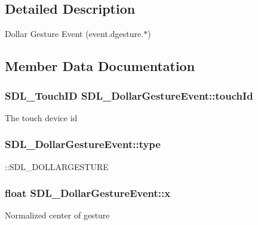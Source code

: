 \subsection{Detailed Description}
Dollar Gesture Event (event.\+dgesture.$\ast$) 

\subsection{Member Data Documentation}
\hypertarget{struct_s_d_l___dollar_gesture_event_a40402f6911ed0dba48e6b23aa02bd83d}{}
\subsubsection[{touch\+Id}]{\setlength{\rightskip}{0pt plus 5cm}S\+D\+L\+\_\+\+Touch\+I\+D S\+D\+L\+\_\+\+Dollar\+Gesture\+Event\+::touch\+Id}\label{struct_s_d_l___dollar_gesture_event_a40402f6911ed0dba48e6b23aa02bd83d}
The touch device id \hypertarget{struct_s_d_l___dollar_gesture_event_ac7f6948754a1b2eb36edde043bf75ce9}{}
\subsubsection[{type}]{ S\+D\+L\+\_\+\+Dollar\+Gesture\+Event\+::type}\label{struct_s_d_l___dollar_gesture_event_ac7f6948754a1b2eb36edde043bf75ce9}
\+::\+S\+D\+L\+\_\+\+D\+O\+L\+L\+A\+R\+G\+E\+S\+T\+U\+R\+E \hypertarget{struct_s_d_l___dollar_gesture_event_a9888449bd8842ed96494b4db16a6097b}{}
\subsubsection[{x}]{\setlength{\rightskip}{0pt plus 5cm}float S\+D\+L\+\_\+\+Dollar\+Gesture\+Event\+::x}\label{struct_s_d_l___dollar_gesture_event_a9888449bd8842ed96494b4db16a6097b}
Normalized center of gesture \hypertarget{struct_s_d_l___dollar_gesture_event_a293b2303acc1cfc63c167c5525e6eab5}{}
